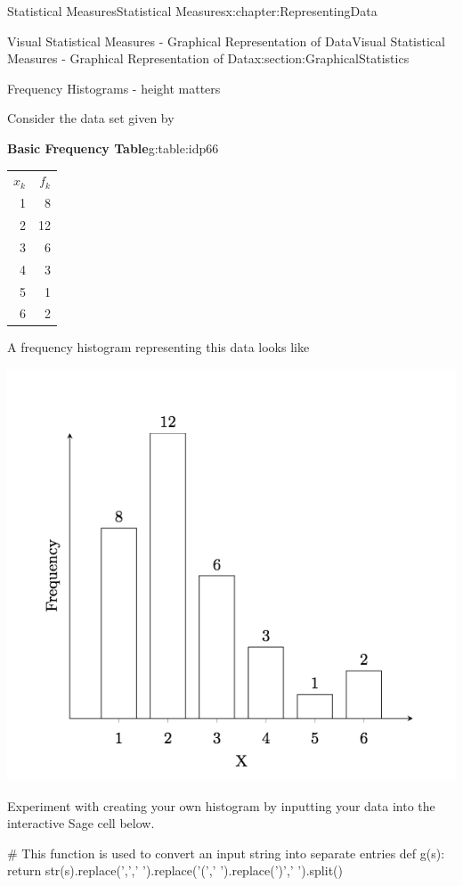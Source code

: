 \documentclass[oneside,10pt,]{book}
\newcommand{\tabularfont}{\relax}
\numberwithin{equation}{section}
\newcommand{\hrulemedium}{\noalign{\hrule height 0.07em}}
\begin{document}
\begin{chapterptx}{Statistical Measures}{}{Statistical Measures}{}{}{x:chapter:RepresentingData}
\begin{sectionptx}{Visual Statistical Measures - Graphical Representation of Data}{}{Visual Statistical Measures - Graphical Representation of Data}{}{}{x:section:GraphicalStatistics}
\par
Frequency Histograms - height matters%
\par
Consider the data set given by \begin{tableptx}{\textbf{Basic Frequency Table}}{g:table:idp66}{}%
\centering
{\tabularfont%
\begin{tabular}{rr}
\(x_k\)&\(f_k\)\tabularnewline\hrulemedium
1&8\tabularnewline[0pt]
2&12\tabularnewline[0pt]
3&6\tabularnewline[0pt]
4&3\tabularnewline[0pt]
5&1\tabularnewline[0pt]
6&2
\end{tabular}
}%
\end{tableptx}%
%
\par
A frequency histogram representing this data looks like \begin{image}{0}{1}{0}%
\includegraphics[width=\linewidth]{images/frequencyhistogram.png}
\end{image}%
%
\par
Experiment with creating your own histogram by inputting your data into the interactive Sage cell below. \leavevmode%
\begin{sageinput}
#  This function is used to convert an input string into separate entries
def g(s): return str(s).replace(',',' ').replace('(',' ').replace(')',' ').split()


\end{sageinput}
\end{sectionptx}
\end{chapterptx}
\end{document}
